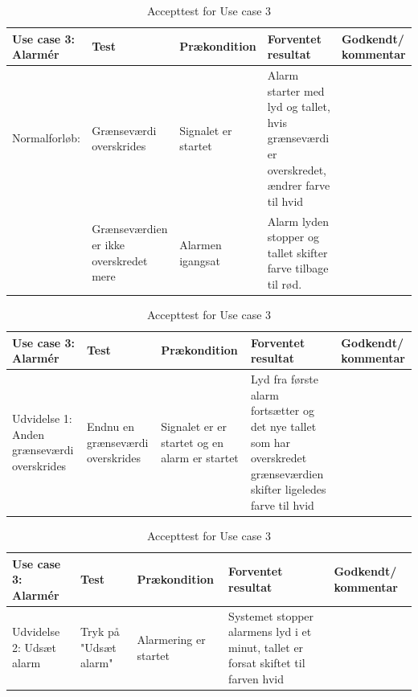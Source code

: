 \begin{table}[H]
\caption{Accepttest for Use case 3}\label{tab:tabel13}
\begin{tabular}{|>{\raggedright\arraybackslash}p{2.5cm}| >{\raggedright\arraybackslash}p{2.9cm} | >{\raggedright\arraybackslash}p{2.9cm} | >{\raggedright\arraybackslash}p{2.9cm} | >{\raggedright\arraybackslash}p{2.8cm} |}
   \hline
   \textbf{Use case 3: Alarmér } &\textbf{Test}& \textbf{Prækondition} & \textbf{Forventet resultat} & \textbf{Godkendt/ kommentar}\\ \hline
   Normalforløb:& Grænseværdi overskrides& Signalet er startet & Alarm starter med lyd og tallet, hvis grænseværdi er overskredet, ændrer farve til hvid &\\\hline
   & Grænseværdien er ikke overskredet mere & Alarmen igangsat & Alarm lyden stopper og tallet skifter farve tilbage til rød. & \\\hline
\end{tabular}
\end{table}



\begin{table}[H]
\caption{Accepttest for Use case 3}\label{tab:tabel14}
\begin{tabular}{|>{\raggedright\arraybackslash}p{2.5cm}| >{\raggedright\arraybackslash}p{2.9cm} | >{\raggedright\arraybackslash}p{2.9cm} | >{\raggedright\arraybackslash}p{2.9cm} | >{\raggedright\arraybackslash}p{2.8cm} |}
   \hline
   \textbf{Use case 3: Alarmér } &\textbf{Test}& \textbf{Prækondition} & \textbf{Forventet resultat} & \textbf{Godkendt/ kommentar}\\ \hline
   Udvidelse 1: Anden grænseværdi overskrides & Endnu en grænseværdi overskrides & Signalet er er startet og en alarm er startet & Lyd fra første alarm fortsætter og det nye tallet som har overskredet grænseværdien skifter ligeledes farve til hvid &\\\hline
\end{tabular}
\end{table}



\begin{table}[H]
\caption{Accepttest for Use case 3}\label{tab:tabel15}
\begin{tabular}{|>{\raggedright\arraybackslash}p{2.5cm}| >{\raggedright\arraybackslash}p{2.9cm} | >{\raggedright\arraybackslash}p{2.9cm} | >{\raggedright\arraybackslash}p{2.9cm} | >{\raggedright\arraybackslash}p{2.8cm} |}
   \hline
   \textbf{Use case 3: Alarmér } &\textbf{Test}& \textbf{Prækondition} & \textbf{Forventet resultat} & \textbf{Godkendt/ kommentar}\\ \hline
   Udvidelse 2: Udsæt alarm & Tryk på "Udsæt alarm" & Alarmering er startet & Systemet stopper alarmens lyd i et minut, tallet er forsat skiftet til farven hvid &\\\hline
\end{tabular}
\end{table}




